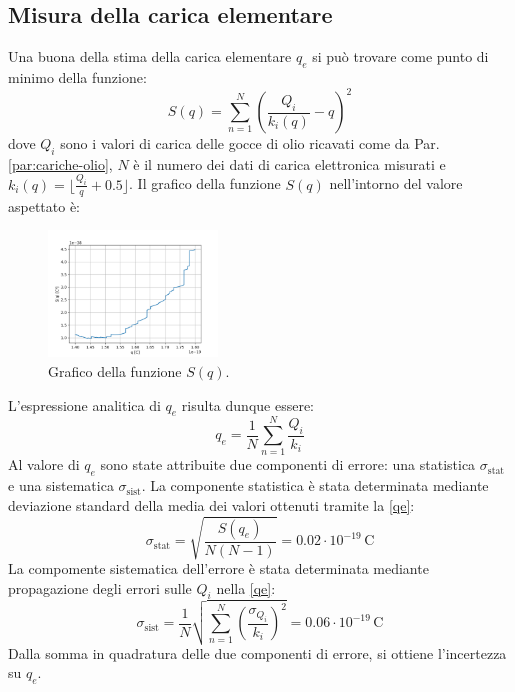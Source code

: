 \documentclass[]{article}
\let\oldsubsection\subsection%
\renewcommand{\subsection}{%
	\renewcommand{\theequation}{\thesubsection.\arabic{equation}}%
	\oldsubsection}%
\begin{document}
    \subsection{Misura della carica elementare}
    Una buona della stima della carica elementare $q_e$ si può trovare come punto di minimo della funzione:
    \begin{equation}
        \label{S-function}
        S(q) = \sum_{n=1}^{N} \left( \frac{Q_i}{k_i \left(q \right)} - q \right)^2
    \end{equation}
    dove $Q_i$ sono i valori di carica delle gocce di olio ricavati come da Par. \ref{par:cariche-olio}, $N$ è il numero dei dati di carica elettronica misurati e $k_i(q)=\lfloor\frac{Q_i}{q} + 0.5 \rfloor$.
    Il grafico della funzione $S(q)$ nell'intorno del valore aspettato è:
    \begin{figure}[H]
        \centering
        \includegraphics[width=0.40\textwidth]{analysis/graph.png}
        \caption{Grafico della funzione $S(q)$.}
        \label{graph}
    \end{figure}    
    L'espressione analitica di $q_e$ risulta dunque essere:
    \begin{equation}
        \label{qe}
        q_e = \frac{1}{N} \sum_{n=1}^{N} \frac{Q_i}{k_i}
    \end{equation}
    Al valore di $q_e$ sono state attribuite due componenti di errore: una statistica $\sigma_{\text{stat}}$ e una sistematica $\sigma_{\text{sist}}$. La componente statistica è stata determinata mediante deviazione standard della media dei valori ottenuti tramite la \ref{qe}:
    \begin{equation}
        \label{sigma-stat}
        \sigma_{\text{stat}} = \sqrt{ \frac{S(q_e)}{N \left(N-1 \right)} } = 0.02 \cdot 10^{-19} \, \text{C}
    \end{equation}
    La compomente sistematica dell'errore è stata determinata mediante propagazione degli errori sulle $Q_i$ nella \ref{qe}:
    \begin{equation}
        \sigma_{\text{sist}} = \frac{1}{N} \sqrt{\sum_{n=1}^{N} \left(\frac{\sigma_{Q_i}}{k_i} \right)^2} = 0.06 \cdot 10^{-19} \, \text{C}
    \end{equation}
    Dalla somma in quadratura delle due componenti di errore, si ottiene l'incertezza su $q_e$.
\end{document}
